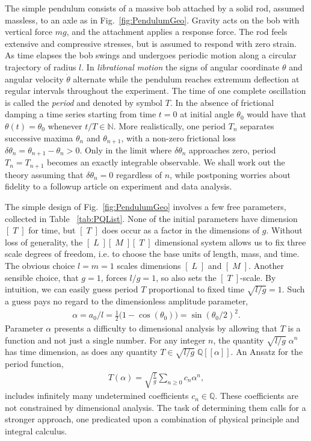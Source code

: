 \documentclass[nofootinbib,preprint]{revtex4-1}
\begin{document}
The simple pendulum consists of a massive bob attached by a solid rod, assumed 
massless, to an axle as in Fig.~\ref{fig:PendulumGeo}. Gravity acts on the bob with 
vertical force $mg$, and the attachment applies a response force. The rod feels 
extensive and compressive stresses, but is assumed to respond with zero strain.
As time elapses the bob swings and undergoes periodic motion 
along a circular trajectory of radius $l$. In \textit{librational motion}
the signs of angular coordinate $\theta$ and angular velocity $\dot{\theta}$ alternate 
while the pendulum reaches extremum deflection at regular intervals throughout the 
experiment. The time of one complete oscillation is called the \textit{period} and 
denoted by symbol $T$. In the absence of frictional damping a time series starting
from time $t=0$ at initial angle $\theta_0$ would have that $\theta(t)=\theta_0$ whenever 
$t/T\in \mathbb{N}$. More realistically, one period $T_n$ separates successive 
maxima $\theta_n$ and $\theta_{n+1}$, with a non-zero frictional loss $\delta\theta_n = 
\theta_{n+1}-\theta_n>0$. Only in the limit where $\delta\theta_n$ approaches zero, 
period $T_n=T_{n+1}$ becomes an exactly integrable observable. We shall work out the theory
assuming that $\delta\theta_n = 0$ regardless of $n$, while postponing worries about
fidelity to a followup article on experiment and data analysis.
\pagebreak

The simple design of Fig.~\ref{fig:PendulumGeo} involves a few free 
parameters, collected in Table ~\ref{tab:PQList}. None of the initial parameters 
have dimension $[\;T\;]$ for time, but $[\;T\;]$ does occur as a factor in the 
dimensions of $g$. Without loss of generality, the $[\;L\;][\;M\;][\;T\;]$ dimensional 
system allows us to fix three scale degrees of freedom, i.e. to choose the base units
of length, mass, and time. The obvious choice $l=m=1$ scales dimensions $[\;L\;]$ and 
$[\;M\;]$. Another sensible choice, that $g=1$, forces $l/g=1$, so also sets the 
$[\;T\;]$-scale. By intuition, we can easily guess period $T$ proportional 
to fixed time $\sqrt{l/g}=1$. Such a guess pays no regard to the dimensionless 
amplitude parameter,
\begin{eqnarray}
\alpha = a_0/l = \frac{1}{2}\big( 1 - \cos(\theta_0) \big) =  \sin(\theta_0 / 2)^2. \nonumber
\end{eqnarray}
Parameter $\alpha$ presents a difficulty to dimensional analysis by allowing that $T$ 
is a function and not just a single number. For any integer $n$, the quantity 
$\sqrt{l/g}\;\alpha^n$ has time dimension, as does any quantity $T \in \sqrt{l/g}\;\mathbb{Q}[\![\alpha]\!]$. 
An Ansatz for the period function, 
\begin{eqnarray}
T(\alpha)=\sqrt{\frac{l}{g}}\sum_{n\ge 0}c_n \alpha^n, \nonumber
\end{eqnarray} 
includes infinitely many undetermined coefficients $c_n \in \mathbb{Q}$. These coefficients 
are not constrained by dimensional analysis. The task of determining them calls for a 
stronger approach, one predicated upon a combination of physical principle and
integral calculus.
\end{document}
